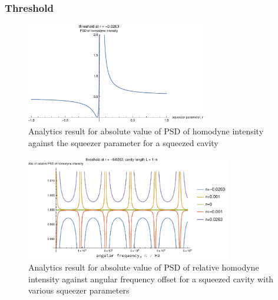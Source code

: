 \documentclass[aps,pra,superscriptaddress,reprint,nofootinbib]{revtex4-1}
\begin{document}
\subsubsection{Threshold}

\begin{figure}
	\begin{center}
	\includegraphics[width=0.7\textwidth]{figures/not_main_PSD_vs_r.pdf}
	\end{center}
	\caption{Analytics result for absolute value of PSD of homodyne intensity against the squeezer parameter for a squeezed cavity}
	\label{fig:not_main_PSD_vs_r}
\end{figure}

\begin{figure}
	\begin{center}
	\includegraphics[width=0.8\textwidth]{figures/not_main_PSD_vs_freq.pdf}
	\end{center}
	\caption{Analytics result for absolute value of PSD of relative homodyne intensity against angular frequency offset for a squeezed cavity with various squeezer parameters}
	\label{fig:not_main_PSD_vs_freq}
\end{figure}
\end{document}
